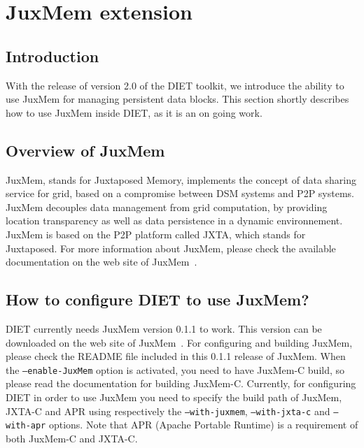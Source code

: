 
\chapter{JuxMem extension}
\label{ch:juxmem}

\section{Introduction}

With the release of version 2.0 of the DIET toolkit, we introduce the
ability to use JuxMem for managing persistent data blocks. This
section shortly describes how to use JuxMem inside DIET, as it is an
on going work.

\section{Overview of JuxMem}

JuxMem, stands for Juxtaposed Memory, implements the concept of data
sharing service for grid, based on a compromise between DSM systems
and P2P systems. JuxMem decouples data management from grid
computation, by providing location transparency as well as data
persistence in a dynamic environnement. JuxMem is based on the P2P
platform called JXTA, which stands for Juxtaposed. For more
information about JuxMem, please check the available documentation on
the web site of JuxMem~\cite{JuxMem}.

\section{How to configure DIET to use JuxMem?}

DIET currently needs JuxMem version 0.1.1 to work. This version can be
downloaded on the web site of JuxMem~\cite{JuxMem}. For configuring
and building JuxMem, please check the README file included in this
0.1.1 release of JuxMem. When the \texttt{--enable-JuxMem} option is
activated, you need to have JuxMem-C build, so please read the
documentation for building JuxMem-C. Currently, for configuring DIET
in order to use JuxMem you need to specify the build path of JuxMem,
JXTA-C and APR using respectively the \texttt{--with-juxmem},
\texttt{--with-jxta-c} and \texttt{--with-apr} options.
Note that APR (Apache Portable Runtime) is a requirement of both
JuxMem-C and JXTA-C.

